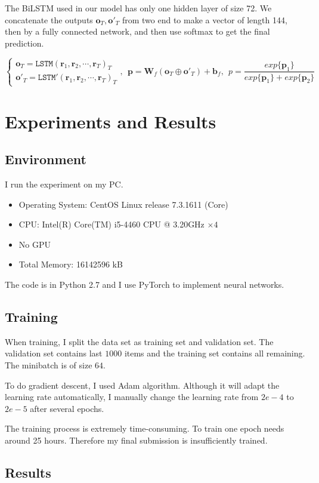 \documentclass{article}
\begin{document}
The BiLSTM used in our model has only one hidden layer of size 72. We concatenate the outputs $\bm o_T, \bm o'_T$ from two end to make a vector of length 144, then by a fully connected network, and then use softmax to get the final prediction.

\[\begin{cases}
	\bm o_T = \mathtt{LSTM}(\bm r_1, \bm r_2, \cdots, \bm r_T)_{T}\\
	\bm o'_T = \mathtt{LSTM}'(\bm r_1, \bm r_2, \cdots, \bm r_T)_{T}
\end{cases}, ~~\bm p = \bm W_f (\bm o_T \oplus \bm o'_T) + \bm b_f,  ~~p = \frac{exp\{\bm p_1\}}{exp\{\bm p_1\} + exp\{\bm p_2\}} \]

\section{Experiments and Results}\label{sec:exps}
\subsection{Environment}
I run the experiment on my PC. 
\begin{itemize}
	\item Operating System: CentOS Linux release 7.3.1611 (Core)
	\item CPU: Intel(R) Core(TM) i5-4460  CPU @ 3.20GHz $\times 4$
	\item No GPU
	\item Total Memory: 16142596 kB
\end{itemize}
The code is in Python 2.7 and I use PyTorch to implement neural networks.

\subsection{Training}
When training, I split the data set as training set and validation set. The validation set contains last $1000$ items and the training set contains all remaining. The minibatch is of size $64$. 

To do gradient descent, I used Adam algorithm. Although it will adapt the learning rate automatically, I manually change the learning rate from $2e-4$ to $2e-5$ after several epochs. 

The training process is extremely time-consuming. To train one epoch needs around 25 hours. Therefore my final submission is insufficiently trained.

\subsection{Results}
\end{document}
